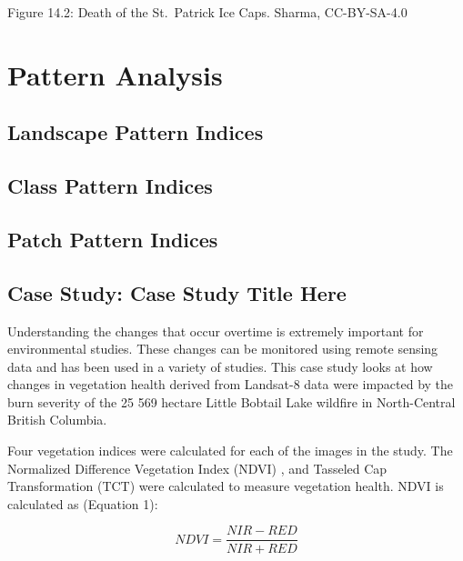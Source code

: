 \documentclass[
]{book}
\begin{document}
Figure 14.2: Death of the St.~Patrick Ice Caps. Sharma, CC-BY-SA-4.0

\hypertarget{pattern-analysis}{%
\section{Pattern Analysis}\label{pattern-analysis}}

\hypertarget{landscape-pattern-indices}{%
\subsection{Landscape Pattern Indices}\label{landscape-pattern-indices}}

\hypertarget{class-pattern-indices}{%
\subsection{Class Pattern Indices}\label{class-pattern-indices}}

\hypertarget{patch-pattern-indices}{%
\subsection{Patch Pattern Indices}\label{patch-pattern-indices}}

\hypertarget{case-study-case-study-title-here}{%
\subsection{Case Study: Case Study Title Here}\label{case-study-case-study-title-here}}

Understanding the changes that occur overtime is extremely important for environmental studies. These changes can be monitored using remote sensing data and has been used in a variety of studies. This case study looks at how changes in vegetation health derived from Landsat-8 data were impacted by the burn severity of the 25 569 hectare Little Bobtail Lake wildfire in North-Central British Columbia.

Four vegetation indices were calculated for each of the images in the study. The Normalized Difference Vegetation Index (NDVI) \citep{rouse_monitoring_1974}, and Tasseled Cap Transformation (TCT) \citep{crist_physically-based_1984} were calculated to measure vegetation health. NDVI is calculated as (Equation 1):

\begin{equation}
\tag{1}
  NDVI = \frac{NIR - RED}{NIR + RED}
\end{equation}
\end{document}
